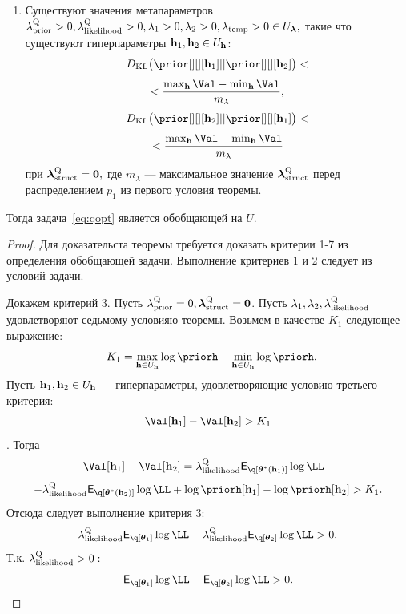 \begin{theorem}
\begin{enumerate}
\item Существуют значения метапараметров $\lambda_\text{prior}^\text{Q}>0,\lambda_\text{likelihood}^\text{Q}>0, \lambda_1>0, \lambda_2>0, \lambda_{\text{temp}}>0  \in U_{\boldsymbol{\lambda}},$ такие что существуют гиперпараметры $\mathbf{h}_1, \mathbf{h}_2 \in U_{\mathbf{h}}$:
\[
\KL{\prior[][][\h_1]}{\prior[][][\h_2]} < 
\]
\[
<\frac{\max_{\h} \Val - \min_{\h} \Val }{m_{\lambda}},
\]
\[
\KL{\prior[][][\h_2]}{\prior[][][\h_1]} <
\]
\[
< \frac{\max_{\h} \Val - \min_{\h} \Val }{m_{\lambda}}
\]
при $\boldsymbol{\lambda}_\text{struct}^\text{Q} = \mathbf{0},$ где $m_{\lambda}$ --- максимальное значение $\boldsymbol{\lambda}_\text{struct}^\text{Q}$ перед распределением $p_1$ из первого условия теоремы.

\end{enumerate}
Тогда задача~\eqref{eq:qopt} является обобщающей на $U$.
\end{theorem}

\begin{proof}
Для доказательста теоремы требуется доказать критерии 1-7 из определения обобщающей задачи.
Выполнение критериев 1 и 2 следует из условий задачи.

Докажем критерий 3. 
Пусть $\lambda_\text{prior}^\text{Q} = 0, \boldsymbol{\lambda}_\text{struct}^\text{Q} = \mathbf{0}$. 
Пусть $\lambda_1, \lambda_2, \lambda_\text{likelihood}^\text{Q}$ удовлетворяют седьмому условияю теоремы.
Возьмем в качестве $K_1$ следующее выражение:
\[
    K_1= \max_{\h \in \Uh} \log \priorh-\min_{\h \in \Uh} \log \priorh.
\]
Пусть $\mathbf{h}_1, \mathbf{h}_2 \in U_{\mathbf{h}}$ --- гиперпараметры, удовлетворяющие условию третьего критерия:
$$ \Val[\h_1] - \Val[\h_2]>K_1$$.
Тогда 
\[
\Val[\h_1] - \Val[\h_2] = \lamLL \E_{\q[\teta^{*}(\h_1)]} \log \LL - 
\]
\[
- \lamLL \E_{\q[\teta^{*}(\h_2)]} \log \LL + \log\priorh[\h_1] - \log\priorh[\h_2]>K_1.
\]
Отсюда следует  выполнение критерия 3:
\[
\lamLL \E_{\q[\teta_1]} \log \LL - \lamLL  \E_{\q[\teta_2]} \log \LL   >0.
\]
Т.к. $\lambda_\text{likelihood}^\text{Q} > 0:$
\[
\E_{\q[\teta_1]} \log \LL -  \E_{\q[\teta_2]} \log \LL   >0.
\]



\end{proof}
